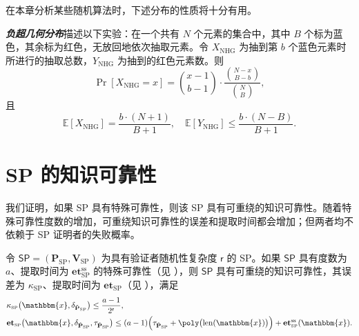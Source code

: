 \documentclass[american,singlepageview]{snargs-book-zh}
\newcommand{\defemph}[1]{\textbf{\emph{#1}}}
\newcommand{\Malicious}[1]{\tilde{#1}}
\newcommand{\Expectation}{\mathbb{E}}
\newcommand{\RandomVariableX}{X}
\newcommand{\RandomVariableY}{Y}
\newcommand{\BitSize}[1]{\mathrm{len}(#1)}
\newcommand{\Instance}{\mathbbm{x}}
\newcommand{\ProtoProver}{P}
\newcommand{\ProtoVerifier}{V}
\newcommand{\ProtoKnowledgeError}{\kappa}
\newcommand{\ProtoKnowledgeTime}{\mathbf{et}}
\newcommand{\ProtoRandomnessComplexity}{\mathsf{r}}
\newcommand{\SPSymbol}{\mathsf{SP}}
\newcommand{\SPSubscript}{\scriptscriptstyle\mathrm{SP}}
\newcommand{\SPFormat}[1]{\mathbf{#1}}
\newcommand{\SPProver}{\SPFormat{\ProtoProver}_{\SPSubscript}}
\newcommand{\SPVerifier}{\SPFormat{\ProtoVerifier}_{\SPSubscript}}
\newcommand{\SPKnowledgeError}{\ProtoKnowledgeError_{\SPSubscript}}
\newcommand{\SPKnowledgeTime}{\ProtoKnowledgeTime_{\SPSubscript}}
\newcommand{\SPMaliciousProver}{\Malicious{\SPFormat{\ProtoProver}}_{\SPSubscript}}
\newcommand{\SPSystem}{(\SPProver,\SPVerifier)}
\newcommand{\SPRandomnessComplexity}{\ProtoRandomnessComplexity}
\newcommand{\SPRandomnessCardinality}{2^{\ProtoRandomnessComplexity}}
\newcommand{\ProverFailureProbability}[1]{\delta_{#1}}
\newcommand{\ProverRunningTime}[1]{\tau_{#1}}
\newcommand{\SSSuperscript}{\mathrm{ss}}
\newcommand{\SSArity}{a}
\newcommand{\SPSSKnowledgeTime}{\ProtoKnowledgeTime_{\SPSubscript}^{\SSSuperscript}}
\newcommand{\NHGSubscript}{\scriptscriptstyle\mathrm{NHG}}
\newcommand{\NHGTotalNumber}{N}
\newcommand{\NHGGoodNumber}{B}
\newcommand{\NHGTargetNumber}{b}
\newcommand{\NHGSampledGood}{\RandomVariableX_{\NHGSubscript}}
\newcommand{\NHGSampledBad}{\RandomVariableY_{\NHGSubscript}}
\begin{document}
在本章分析某些随机算法时，下述分布的性质将十分有用。

\begin{definition}
\label{definition:negative-hypergeometric-distribution}
\defemph{负超几何分布}描述以下实验：在一个共有 $\NHGTotalNumber$ 个元素的集合中，其中 $\NHGGoodNumber$ 个标为蓝色，其余标为红色，无放回地依次抽取元素。令 $\NHGSampledGood$ 为抽到第 $\NHGTargetNumber$ 个蓝色元素时所进行的抽取总数，$\NHGSampledBad$ 为抽到的红色元素数。则
\[
  \Pr[\NHGSampledGood=x]
  = \binom{x-1}{\NHGTargetNumber-1}
    \cdot
    \frac{\binom{\NHGTotalNumber-x}{\NHGGoodNumber-\NHGTargetNumber}}
         {\binom{\NHGTotalNumber}{\NHGGoodNumber}},
\]
且
\[
  \Expectation[\NHGSampledGood]
  = \frac{\NHGTargetNumber\cdot(\NHGTotalNumber+1)}{\NHGGoodNumber+1},
  \quad
  \Expectation[\NHGSampledBad]
  \le \frac{\NHGTargetNumber\cdot(\NHGTotalNumber-\NHGGoodNumber)}{\NHGGoodNumber+1}.
\]
\end{definition}

\section{SP 的知识可靠性}
\label{section:ss-sigma-protocols-knowledge}

我们证明，如果 SP 具有特殊可靠性，则该 SP 具有可重绕的知识可靠性。随着特殊可靠性度数的增加，可重绕知识可靠性的误差和提取时间都会增加；但两者均不依赖于 SP 证明者的失败概率。

\begin{theorem}
\label{theorem:ss-to-knowledge-soundness-for-sp}
令 $\SPSymbol=\SPSystem$ 为具有验证者随机性复杂度 $\SPRandomnessComplexity$ 的 SP。如果 $\SPSymbol$ 具有度数为 $\SSArity$、提取时间为 $\SPSSKnowledgeTime$ 的特殊可靠性（见 ），则 $\SPSymbol$ 具有可重绕的知识可靠性，其误差为 $\SPKnowledgeError$、提取时间为 $\SPKnowledgeTime$（见 ），满足
\begin{align*}
& \SPKnowledgeError\bigl(\Instance,\ProverFailureProbability{\SPMaliciousProver}\bigr)
  \le
  \frac{\SSArity - 1}{\SPRandomnessCardinality},
\\
& \SPKnowledgeTime\bigl(\Instance,\ProverFailureProbability{\SPMaliciousProver},\ProverRunningTime{\SPMaliciousProver}\bigr)
  \le
  (\SSArity-1)\Bigl(\ProverRunningTime{\SPMaliciousProver}+\poly\bigl(\BitSize{\Instance}\bigr)\Bigr)
  +\SPSSKnowledgeTime(\Instance).
\end{align*}
\end{theorem}
\end{document}
